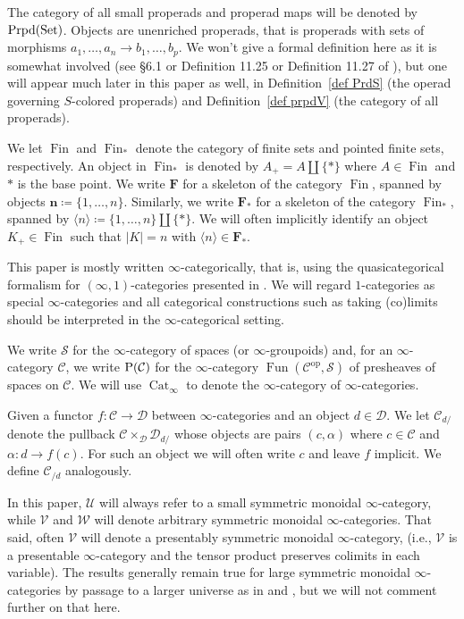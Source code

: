 \documentclass{amsart}
\numberwithin{theorem}{subsection}
\theoremstyle{definition}
\providecommand{\op}{\mathrm{op}}
\newcommand{\xFun}{\operatorname{Fun}}
\newcommand{\finset}{\operatorname{Fin}}
\newcommand{\pfinset}{\finset_*}
\newcommand{\finsetskel}{\mathbf{F}}
\newcommand{\pfinsetskel}{\finsetskel_*}
\newcommand{\xCat}{\operatorname{Cat}}
\newcommand{\xcc}{\mathcal{C}}
\newcommand{\xS}{\mathcal{S}}
\newcommand{\xU}{\mathcal{U}}
\newcommand{\xV}{\mathcal{V}}
\newcommand{\xW}{\mathcal{W}}
\newcommand{\Pre}{\name{P}}
\newcommand{\icat}{$\infty$-category}
\newcommand{\name}[1]{\ensuremath{\text{\textup{#1}}}}
\newcommand{\Set}{\name{Set}}
\newcommand{\properads}{\name{Prpd}(\Set)}
\begin{document}
The category of all small properads and properad maps will be denoted by $\properads$. 
Objects are unenriched properads, that is properads with sets of morphisms $a_1, \dots, a_n \to b_1, \dots, b_p$. 
We won't give a formal definition here as it is somewhat involved (see \S6.1 \cite{Duncan:TQC} or Definition 11.25 or Definition 11.27 of \cite{YauJohnson:FPAM}), but one will appear much later in this paper as well, in Definition~\ref{def PrdS} (the operad governing $S$-colored properads) and Definition~\ref{def prpdV} (the category of all properads).

We let $\finset$ and $\pfinset$ denote the category of finite sets and pointed finite sets, respectively. 
An object in $\pfinset$ is denoted by $A_+=A\amalg \{*\}$ where $A\in \finset$ and $*$ is the base point.
We write $\finsetskel$ for a skeleton of the category $\finset$, spanned by objects $\mathbf{n} \coloneqq \{1,\ldots,n\}$. 
Similarly, we write $\pfinsetskel$ for a skeleton of the category $\pfinset$, spanned by $\langle n \rangle \coloneqq \{1,\ldots,n\}\amalg\{*\}$. 
We will often implicitly identify an object $K_{+}\in \finset$ such that $|K| = n$ with $\langle n \rangle\in\pfinsetskel$.



This paper is mostly written $\infty$-categorically, that is, using the quasicategorical formalism for $(\infty,1)$-categories presented in \cite{ht}.
We will regard $1$-categories as special $\infty$-categories and all categorical constructions such as taking (co)limits should be interpreted in the $\infty$-categorical setting.

We write $\xS$ for the $\infty$-category of spaces (or $\infty$-groupoids) and, for an $\infty$-category $\xcc$, we write $\Pre(\xcc)$ for the $\infty$-category $\xFun(\xcc^\op,\xS)$ of presheaves of spaces on $\xcc$.
We will use $\xCat_\infty$ to denote the $\infty$-category of $\infty$-categories.

Given a functor $f\colon \xcc \to \mathcal{D}$ between $\infty$-categories and an object $d\in \mathcal{D}$. We let $\xcc_{d/}$ denote the pullback $\xcc\times_{\mathcal{D}} \mathcal{D}_{d/}$ whose objects are pairs $(c, \alpha)$ where $c\in \xcc$ and $\alpha\colon d\to f(c)$. For such an object we will often write $c$ and leave $f$ implicit. We define $\xcc_{/d}$ analogously.

In this paper, $\xU$ will always refer to a small symmetric monoidal \icat{}, while $\xV$ and $\xW$ will denote arbitrary symmetric monoidal $\infty$-categories.
That said, often $\xV$ will denote a presentably symmetric monoidal \icat{}, (i.e., $\xV$ is a presentable \icat{} and the tensor product preserves colimits in each variable).
The results generally remain true for large symmetric monoidal $\infty$-categories by passage to a larger universe as in \cite[Remark 3.5.9]{ChuHaugseng} and \cite[Theorem 5.6.6]{enriched}, but we will not comment further on that here.
\end{document}
